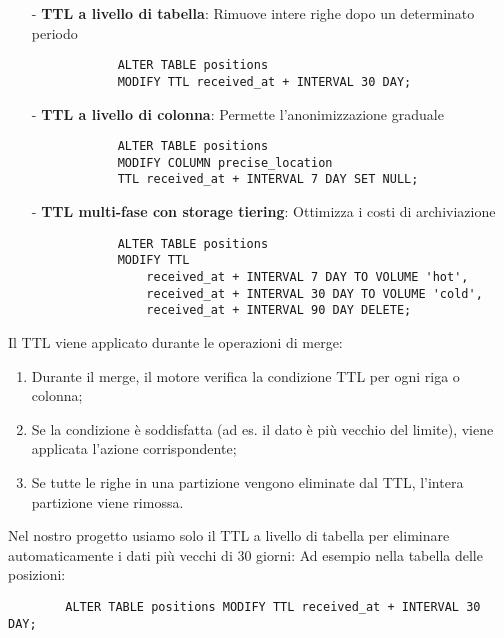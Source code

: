 \documentclass[10pt]{article}
\begin{document}
        \begin{itemize}
            \item[-] \textbf{TTL a livello di tabella}: Rimuove intere righe dopo un determinato periodo
            \begin{lstlisting}
            ALTER TABLE positions 
            MODIFY TTL received_at + INTERVAL 30 DAY;
            \end{lstlisting}
            
            \item[-] \textbf{TTL a livello di colonna}: Permette l'anonimizzazione graduale
            \begin{lstlisting}
            ALTER TABLE positions 
            MODIFY COLUMN precise_location 
            TTL received_at + INTERVAL 7 DAY SET NULL;
            \end{lstlisting}
            
            \item[-] \textbf{TTL multi-fase con storage tiering}: Ottimizza i costi di archiviazione
            \begin{lstlisting}
            ALTER TABLE positions
            MODIFY TTL
                received_at + INTERVAL 7 DAY TO VOLUME 'hot',
                received_at + INTERVAL 30 DAY TO VOLUME 'cold',
                received_at + INTERVAL 90 DAY DELETE;
            \end{lstlisting}
        \end{itemize}
        
        Il TTL viene applicato durante le operazioni di merge:
        \begin{enumerate}
            \item Durante il merge, il motore verifica la condizione TTL per ogni riga o colonna;
            \item Se la condizione è soddisfatta (ad es. il dato è più vecchio del limite), viene applicata l'azione corrispondente;
            \item Se tutte le righe in una partizione vengono eliminate dal TTL, l'intera partizione viene rimossa.
        \end{enumerate}
        
        Nel nostro progetto usiamo solo il TTL a livello di tabella per eliminare automaticamente i dati più vecchi di 30 giorni:
        Ad esempio nella tabella delle posizioni:
        \begin{lstlisting}
        ALTER TABLE positions MODIFY TTL received_at + INTERVAL 30 DAY;
        \end{lstlisting}
\end{document}
